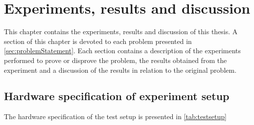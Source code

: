 
\chapter{Experiments, results and discussion}
\label{cha:experiments}
This chapter contains the experiments, results and discussion of this thesis. A section of this chapter is devoted to each problem presented in \cref{sec:problemStatement}. Each section contains a description of the experiments performed to prove or disprove the problem, the results obtained from the experiment and a discussion of the results in relation to the original problem.




\section{Hardware specification of experiment setup}\label{sec:hardwareSepc}
The hardware specification of the test setup is presented in \cref{tab:testsetup}

